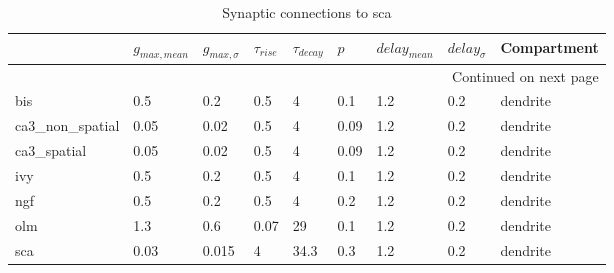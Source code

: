 \begin{longtable}{lllllllll}
\caption{Synaptic connections to sca}\label{sca_synapses}\\
\toprule
{} &  $g_{max, mean}$ & $g_{max, \sigma}$ & $\tau_{rise}$ & $\tau_{decay}$ &  $p$ & $delay_{mean}$ & $delay_{\sigma}$ & Compartment \\
\midrule
\endhead
\midrule
\multicolumn{9}{r}{{Continued on next page}} \\
\midrule
\endfoot

\bottomrule
\endlastfoot
bis             &   0.5 &      0.2 &      0.5 &         4 &   0.1 &   1.2 &       0.2 &      dendrite\ \\
ca3\_non\_spatial &  0.05 &     0.02 &      0.5 &         4 &  0.09 &   1.2 &       0.2 &      dendrite\ \\
ca3\_spatial     &  0.05 &     0.02 &      0.5 &         4 &  0.09 &   1.2 &       0.2 &      dendrite\ \\
ivy             &   0.5 &      0.2 &      0.5 &         4 &   0.1 &   1.2 &       0.2 &      dendrite\ \\
ngf             &   0.5 &      0.2 &      0.5 &         4 &   0.2 &   1.2 &       0.2 &      dendrite\ \\
olm             &   1.3 &      0.6 &     0.07 &        29 &   0.1 &   1.2 &       0.2 &      dendrite\ \\
sca             &  0.03 &    0.015 &        4 &      34.3 &   0.3 &   1.2 &       0.2 &      dendrite\ \\
\end{longtable}
